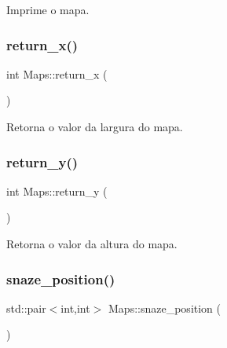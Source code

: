 Imprime o mapa. 

\mbox{\label{classMaps_ab77f2fa68caba59dca05fb403edc9099}} 
\subsubsection{\texorpdfstring{return\+\_\+x()}{return\_x()}}
{\footnotesize\ttfamily int Maps\+::return\+\_\+x (\begin{DoxyParamCaption}{ }\end{DoxyParamCaption})\hspace{0.3cm}{\ttfamily [inline]}}



Retorna o valor da largura do mapa. 

\mbox{\label{classMaps_a93da8a525b47eabad3a9f31ab8c5cfc5}} 
\subsubsection{\texorpdfstring{return\+\_\+y()}{return\_y()}}
{\footnotesize\ttfamily int Maps\+::return\+\_\+y (\begin{DoxyParamCaption}{ }\end{DoxyParamCaption})\hspace{0.3cm}{\ttfamily [inline]}}



Retorna o valor da altura do mapa. 

\mbox{\label{classMaps_a5db28b22a32d650536c264c0354e3e72}} 
\subsubsection{\texorpdfstring{snaze\+\_\+position()}{snaze\_position()}}
{\footnotesize\ttfamily std\+::pair$<$int,int$>$ Maps\+::snaze\+\_\+position (\begin{DoxyParamCaption}{ }\end{DoxyParamCaption})\hspace{0.3cm}{\ttfamily [inline]}}



